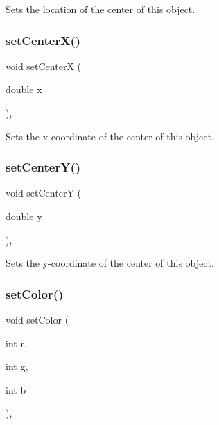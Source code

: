 Sets the location of the center of this object. 

\mbox{\label{classsgl_1_1GObject_a2f4936281e056eead00a9186b9ba8af6}} 
\subsubsection{\texorpdfstring{set\+Center\+X()}{setCenterX()}}
{\footnotesize\ttfamily void set\+CenterX (\begin{DoxyParamCaption}\item[{double}]{x }\end{DoxyParamCaption})\hspace{0.3cm}{\ttfamily [virtual]}, {\ttfamily [inherited]}}



Sets the x-\/coordinate of the center of this object. 

\mbox{\label{classsgl_1_1GObject_aad2a22b4fde88c33306b92aebf641d57}} 
\subsubsection{\texorpdfstring{set\+Center\+Y()}{setCenterY()}}
{\footnotesize\ttfamily void set\+CenterY (\begin{DoxyParamCaption}\item[{double}]{y }\end{DoxyParamCaption})\hspace{0.3cm}{\ttfamily [virtual]}, {\ttfamily [inherited]}}



Sets the y-\/coordinate of the center of this object. 

\mbox{\label{classsgl_1_1GObject_ad57ef49bc31db94e92648aa3737923d6}} 
\subsubsection{\texorpdfstring{set\+Color()}{setColor()}\hspace{0.1cm}{\footnotesize\ttfamily [1/3]}}
{\footnotesize\ttfamily void set\+Color (\begin{DoxyParamCaption}\item[{int}]{r,  }\item[{int}]{g,  }\item[{int}]{b }\end{DoxyParamCaption})\hspace{0.3cm}{\ttfamily [virtual]}, {\ttfamily [inherited]}}



